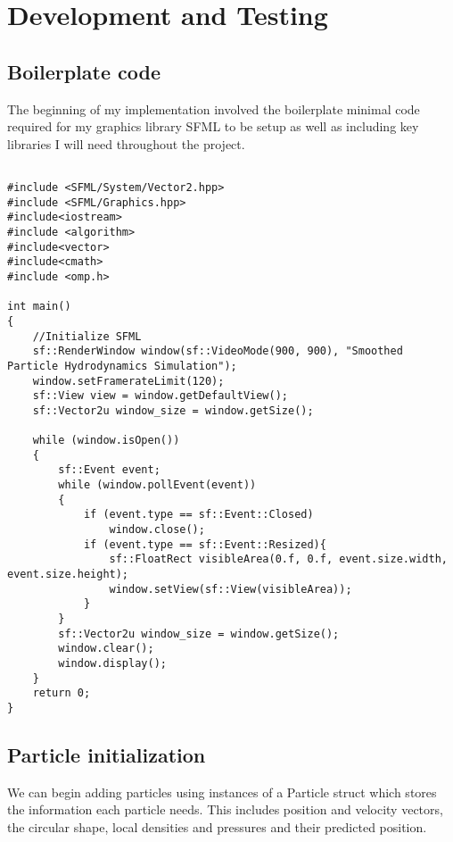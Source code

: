 \documentclass[write-up.tex]{subfiles}
\begin{document}
\section{Development and Testing}
\subsection{Boilerplate code}

The beginning of my implementation involved the boilerplate minimal code required for my graphics library SFML to be setup as well as including key libraries I will need throughout the project.
\begin{lstlisting}

#include <SFML/System/Vector2.hpp>
#include <SFML/Graphics.hpp>
#include<iostream>
#include <algorithm>
#include<vector>
#include<cmath>
#include <omp.h>

int main()
{
    //Initialize SFML
    sf::RenderWindow window(sf::VideoMode(900, 900), "Smoothed Particle Hydrodynamics Simulation");
    window.setFramerateLimit(120);
    sf::View view = window.getDefaultView();
    sf::Vector2u window_size = window.getSize();

    while (window.isOpen())
    {
        sf::Event event;
        while (window.pollEvent(event))
        {
            if (event.type == sf::Event::Closed)
                window.close();
            if (event.type == sf::Event::Resized){
                sf::FloatRect visibleArea(0.f, 0.f, event.size.width, event.size.height);
                window.setView(sf::View(visibleArea));
            }
        }
        sf::Vector2u window_size = window.getSize();
        window.clear();
        window.display();
    }
    return 0;
}
\end{lstlisting}

\subsection{Particle initialization}
We can begin adding particles using instances of a Particle struct which stores the information each particle needs. This includes position and velocity vectors, the circular shape, local densities and pressures and their predicted position.
\end{document}
